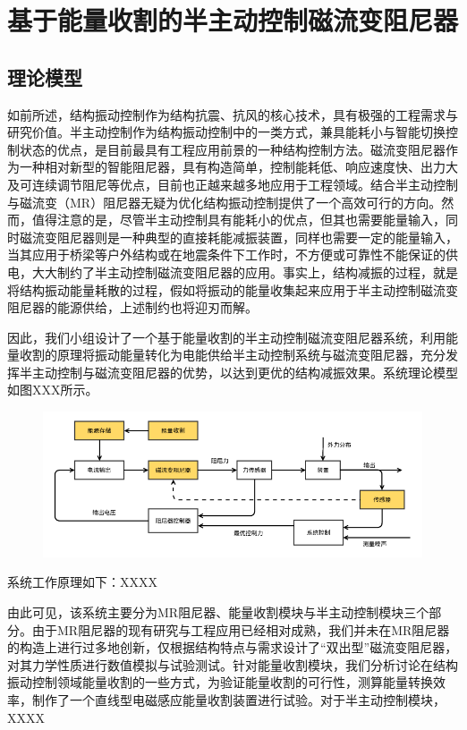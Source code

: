 \section{基于能量收割的半主动控制磁流变阻尼器}
\subsection{理论模型}
如前所述，结构振动控制作为结构抗震、抗风的核心技术，具有极强的工程需求与研究价值。半主动控制作为结构振动控制中的一类方式，兼具能耗小与智能切换控制状态的优点，是目前最具有工程应用前景的一种结构控制方法。磁流变阻尼器作为一种相对新型的智能阻尼器，具有构造简单，控制能耗低、响应速度快、出力大及可连续调节阻尼等优点，目前也正越来越多地应用于工程领域。结合半主动控制与磁流变（MR）阻尼器无疑为优化结构振动控制提供了一个高效可行的方向。然而，值得注意的是，尽管半主动控制具有能耗小的优点，但其也需要能量输入，同时磁流变阻尼器则是一种典型的直接耗能减振装置，同样也需要一定的能量输入，当其应用于桥梁等户外结构或在地震条件下工作时，不方便或可靠性不能保证的供电，大大制约了半主动控制磁流变阻尼器的应用。事实上，结构减振的过程，就是将结构振动能量耗散的过程，假如将振动的能量收集起来应用于半主动控制磁流变阻尼器的能源供给，上述制约也将迎刃而解。

因此，我们小组设计了一个基于能量收割的半主动控制磁流变阻尼器系统，利用能量收割的原理将振动能量转化为电能供给半主动控制系统与磁流变阻尼器，充分发挥半主动控制与磁流变阻尼器的优势，以达到更优的结构减振效果。系统理论模型如图XXX所示。

\begin{figure}
\centering
{}
\includegraphics[width=0.7\linewidth]{figure/structure}
\end{figure}

系统工作原理如下：XXXX

由此可见，该系统主要分为MR阻尼器、能量收割模块与半主动控制模块三个部分。由于MR阻尼器的现有研究与工程应用已经相对成熟，我们并未在MR阻尼器的构造上进行过多地创新，仅根据结构特点与需求设计了“双出型”磁流变阻尼器，对其力学性质进行数值模拟与试验测试。针对能量收割模块，我们分析讨论在结构振动控制领域能量收割的一些方式，为验证能量收割的可行性，测算能量转换效率，制作了一个直线型电磁感应能量收割装置进行试验。对于半主动控制模块，XXXX

